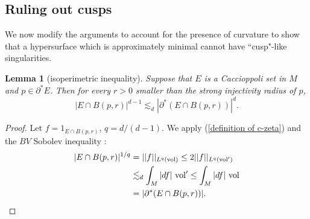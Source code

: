 \documentclass[reqno,12pt,letterpaper]{amsart}
\newcommand{\vol}{\mathrm{vol}}
\newtheorem{lemma}[theorem]{Lemma}
\theoremstyle{definition}
\numberwithin{equation}{section}
\begin{document}
\subsection{Ruling out cusps}
We now modify the arguments \cite{Mooney11} to account for the presence of curvature to show that a hypersurface which is approximately minimal cannot have ``cusp"-like singularities.

\begin{lemma}[isoperimetric inequality]\label{isoperimetric inequality}
Suppose that $E$ is a Caccioppoli set in $M$ and $p \in \partial^* E$.
Then for every $r > 0$ smaller than the strong injectivity radius of $p$,
$$|E \cap B(p, r)|^{d - 1} \lesssim_d |\partial^*(E \cap B(p, r))|^d.$$
\end{lemma}
\begin{proof}
Let $f = 1_{E \cap B(p, r)}$, $q = d/(d-1)$.
We apply (\ref{definition of c-zeta}) and the $BV$ Sobolev inequality \cite[\S5.6.1]{evans1991measure}:
\begin{align*}
|E \cap B(p, r)|^{1/q} &= ||f||_{L^q(\vol)} \leq 2||f||_{L^q(\vol')} \\
&\lesssim_d \int_M |df| ~\vol' \leq \int_M |df| ~\vol\\
&= |\partial^*(E \cap B(p, r))|. \qedhere
\end{align*}
\end{proof}
\end{document}
